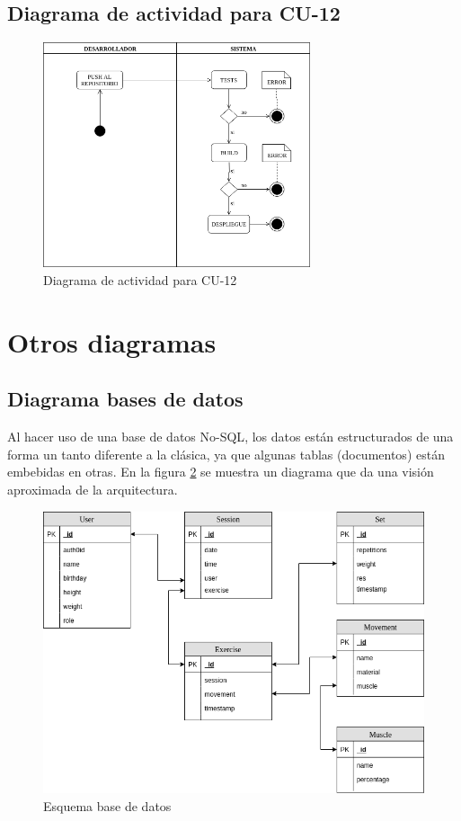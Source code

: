 \subsection{Diagrama de actividad para CU-12 }
\begin{figure}[H]
  \begin{center}
    \includegraphics[width=0.7\textwidth]{imagenes/DA-CU-12.png}
    \caption{Diagrama de actividad para CU-12}
    \label{fig:DA-CU-12}
  \end{center}
\end{figure}


\section {Otros diagramas}
\subsection {Diagrama  bases de datos}
Al hacer uso de una base de datos \gls{No-SQL}, los datos están estructurados de una forma un tanto diferente a la clásica, ya que algunas tablas (documentos) están embebidas en otras. En la figura \ref{fig:db} se muestra un diagrama que da una visión aproximada de la arquitectura.

\begin{figure}
  \begin{center}
    \includegraphics[width=\textwidth]{imagenes/db.png}
    \caption{Esquema base de datos}
    \label{fig:db}
  \end{center}
\end{figure}

